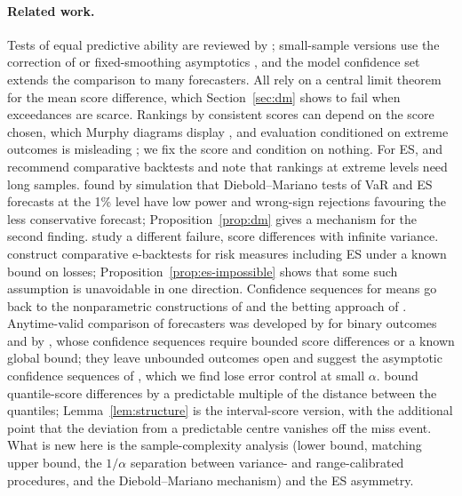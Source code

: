 \documentclass[11pt]{article}
\theoremstyle{remark}
\theoremstyle{definition}
\begin{document}
\paragraph{Related work.}
Tests of equal predictive ability are reviewed by \citet{diebold2015comparing};
small-sample versions use the correction of
\citet{harvey1997testing} or fixed-smoothing asymptotics
\citep{coroneo2020comparing}, and the model confidence set
\citep{hansen2011model} extends the comparison to many forecasters. All
rely on a central limit theorem for the mean score difference, which
Section~\ref{sec:dm} shows to fail when exceedances are scarce. Rankings
by consistent scores can depend on the score chosen, which Murphy
diagrams display \citep{ehm2016quantiles}, and evaluation conditioned on
extreme outcomes is misleading \citep{lerch2017forecaster}; we fix the
score and condition on nothing. For ES,
\citet{fissler2016expected} and \citet{nolde2017elicitability} recommend
comparative backtests and note that rankings at extreme levels need long
samples.
\citet{bauer2025evaluating} found by simulation that Diebold--Mariano tests
of VaR and ES forecasts at the 1\% level have low power and wrong-sign
rejections favouring the less conservative forecast;
Proposition~\ref{prop:dm} gives a mechanism for the second finding.
\citet{frederiksen2026heavy} study a different failure, score differences
with infinite variance. \citet{jiao2025standard} construct comparative
e-backtests for risk measures including ES under a known bound on losses;
Proposition~\ref{prop:es-impossible} shows that some such assumption is
unavoidable in one direction. Confidence sequences for means go back to the
nonparametric constructions of \citet{howard2021time} and the betting
approach of \citet{waudbysmith2024estimating}. Anytime-valid comparison of
forecasters was developed by \citet{henzi2022valid} for binary outcomes and
by
\citet{choe2024comparing}, whose confidence sequences require bounded score
differences or a known global bound; they leave unbounded outcomes open and
suggest the asymptotic confidence sequences of \citet{waudbysmith2024time},
which we find lose error control at small $\alpha$.
\citet[Lemma~B.1]{arnold2026sequential} bound quantile-score differences by
a predictable multiple of the distance between the quantiles;
Lemma~\ref{lem:structure} is the interval-score version, with the
additional point that the deviation from a predictable centre vanishes off
the miss event. What is new here is the sample-complexity
analysis (lower bound, matching upper bound, the $1/\alpha$ separation
between variance- and range-calibrated procedures, and the
Diebold--Mariano mechanism) and the ES asymmetry.
\end{document}
